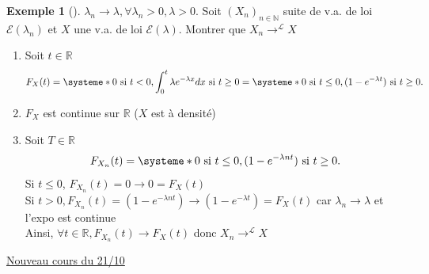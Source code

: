 \documentclass{article}
\theoremstyle{plain}%
\theoremstyle{definition}
\newtheorem{exmp}{Exemple}[section]
\theoremstyle{remark}
\begin{document}
\begin{exmp}[]
    $ \lambda _n \to \lambda, \forall \lambda _n>0, \lambda >0 $. Soit $ (X_n)_{n \in \mathbb{N}} $  suite de v.a. de loi $ \mathcal{E}(\lambda _n) $ et $ X $ une v.a. de loi $ \mathcal{E}(\lambda ) $. Montrer que $ X_n \to ^\mathcal{L}X $ \begin{enumerate}
        \item Soit $ t \in \mathbb{R} $ 
        \[
            F_X(t) = \systeme*{
                0 \text{ si } t<0,
                \int_{0}^{t}\lambda e^{-\lambda x}dx \text{ si } t \geq 0
            } = \systeme*{
                0 \text{ si } t \leq 0,
                {(1-e^{-\lambda t})} \text{ si } t \geq 0
            }
        .\]
        \item $ F_X $ est continue sur $ \mathbb{R} $ ($ X $ est à densité)
        \item Soit $ T \in \mathbb{R} $ 
        \[
            F_{X_n}(t)= \systeme*{
                0 \text{ si } t \leq 0, 
                ({1-e^{-\lambda nt})} \text{ si } t \geq 0
            }
        .\]
        Si $ t \leq 0 $, $ F_{X_n}(t) = 0 \to 0=F_X(t) $ \\
        Si $ t > 0, F_{X_n}(t) = (1-e^{-\lambda nt}) \to {(1-e^{-\lambda t})} = F_X(t) $ car $ \lambda _n \to \lambda  $ et l'expo est continue \\
        Ainsi, $ \forall t \in \mathbb{R}, F_{X_n}(t) \to F_X(t) $ donc $ X_n \to ^\mathcal{L} X $ 
    \end{enumerate}
\end{exmp}

\underline{Nouveau cours du 21/10} \\
\end{document}
